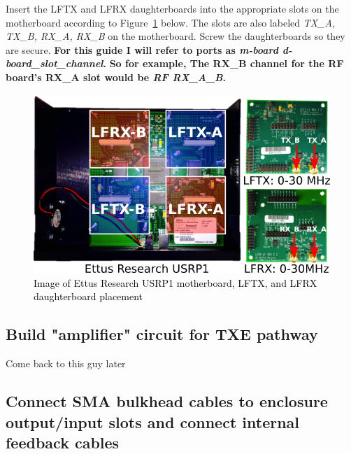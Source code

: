 \documentclass[11pt, oneside]{article}   	%
\begin{document}
\indent Insert the LFTX and LFRX daughterboards into the appropriate slots on the motherboard according to  Figure~\ref{fig:motherboard_img} below.  The slots are also labeled \textit{TX\_A, TX\_B, RX\_A, RX\_B} on the motherboard.  Screw the daughterboards so they are secure.  \textbf{For this guide I will refer to ports as \emph{m-board d-board\_slot\_channel}.} \textbf{ So for example, The RX\_B channel for the RF board's RX\_A slot would be \emph{RF RX\_A\_B}.}

\begin{figure}[!ht]
\begin{center}
\includegraphics[width = \textwidth,trim=0 0 0 0,clip=false]{motherboard_img.png}
\caption{\textcolor{black}{Image of Ettus Research USRP1 motherboard, LFTX, and LFRX daughterboard placement}}
\label{fig:motherboard_img}
\end{center}
\end{figure}

\subsection{Build "amplifier" circuit for TXE pathway}

\indent Come back to this guy later

\subsection{Connect SMA bulkhead cables to enclosure output/input slots and connect internal feedback cables}
\end{document}
